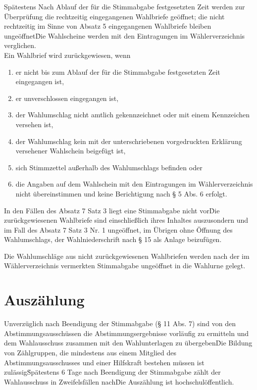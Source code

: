 \begin{multicols}{2}
\Abs \Satz Spätestens Nach Ablauf der für die Stimmabgabe festgesetzten Zeit werden zur Überprüfung die rechtzeitig eingegangenen Wahlbriefe geöffnet; die nicht rechtzeitig im Sinne von Absatz 5 eingegangenen Wahlbriefe bleiben ungeöffnet\. Die Wahlscheine werden mit den Eintragungen im Wählerverzeichnis verglichen.\\
\Satz Ein Wahlbrief wird zurückgewiesen, wenn
\begin{enumerate}
\item er nicht bis zum Ablauf der für die Stimmabgabe festgesetzten Zeit eingegangen ist,
\item er unverschlossen eingegangen ist,
\item der Wahlumschlag nicht amtlich gekennzeichnet oder mit einem Kennzeichen
versehen ist,
\item der Wahlumschlag kein mit der unterschriebenen vorgedruckten Erklärung
versehener Wahlschein beigefügt ist,
\item sich Stimmzettel außerhalb des Wahlumschlags befinden oder
\item die Angaben auf dem Wahlschein mit den Eintragungen im Wählerverzeichnis
nicht übereinstimmen und keine Berichtigung nach § 5 Abs. 6 erfolgt.
\end{enumerate}

\Abs \Satz In den Fällen des Absatz 7 Satz 3 liegt eine Stimmabgabe nicht vor\. Die zurückgewiesenen Wahlbriefe sind einschließlich ihres Inhaltes auszusondern und im Fall des Absatz 7 Satz 3 Nr. 1 ungeöffnet, im Übrigen ohne Öffnung des Wahlumschlags, der Wahlniederschrift nach § 15 als Anlage beizufügen.

\Abs \Satz Die Wahlumschläge aus nicht zurückgewiesenen Wahlbriefen werden nach der im Wählerverzeichnis vermerkten Stimmabgabe ungeöffnet in die Wahlurne gelegt.

\section{Auszählung}
\Abs \Satz Unverzüglich nach Beendigung der Stimmabgabe (§ 11 Abs. 7) sind von den Abstimmungsausschüssen die Abstimmungsergebnisse vorläufig zu ermitteln und dem Wahlausschuss zusammen mit den Wahlunterlagen zu übergeben\. Die Bildung von Zählgruppen, die mindestens aus einem Mitglied des Abstimmungsausschusses und einer Hilfskraft bestehen müssen ist zulässig\. Spätestens 6 Tage nach Beendigung der Stimmabgabe zählt der Wahlausschuss in Zweifelsfällen nach\. Die Auszählung ist hochschulöffentlich.


\end{multicols}
